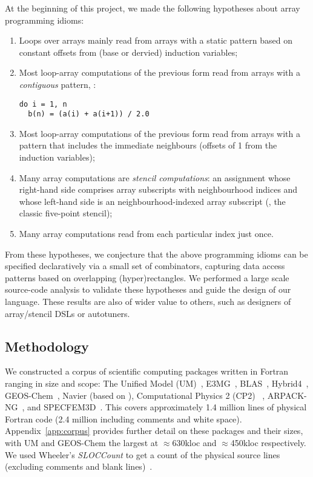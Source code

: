 
At the beginning of this project, we made the following hypotheses
about array programming idioms:
\begin{enumerate}
\item Loops over arrays mainly read from arrays with a static pattern
based on constant offsets from (base or dervied) induction variables;

\item Most loop-array computations of the previous form read
from arrays with a \emph{contiguous} pattern, \eg{}:
%
\begin{verbatim}
do i = 1, n
  b(n) = (a(i) + a(i+1)) / 2.0
\end{verbatim}
%
\item Most loop-array computations of the previous form read
from arrays with a pattern that includes the immediate
neighbours (offsets of 1 from the induction variables);

\item Many array computations are \emph{stencil computations}: an
  assignment whose right-hand side comprises array subscripts with
  neighbourhood indices and whose left-hand side is an
  neighbourhood-indexed array subscript (\eg{}, the classic five-point
  stencil);

\item Many array computations read from each particular index just once.
\end{enumerate}
%
From these hypotheses, we conjecture that the above programming idioms
can be specified declaratively via a small
set of combinators, capturing data access patterns based on
overlapping (hyper)rectangles. We performed a large scale source-code
analysis to validate these hypotheses and guide the design of our
language. These results are also of wider value to others, such as
designers of array/stencil DSLs or autotuners.

\subsection{Methodology}
%
\noindent
We constructed a corpus of \numPackages{} scientific computing
packages written in Fortran ranging in size and scope: The Unified
Model (UM)~\cite{um}, E3MG~\cite{RePEc:aen:journl:2006se-a12},
BLAS~\cite{blas}, Hybrid4~\cite{GBC:GBC635},
GEOS-Chem~\cite{geos-chem}, Navier (based on
\cite{griebel1997numerical}), Computational Physics 2 (CP2)
~\cite{nicholas2006computational}, ARPACK-NG~\cite{arpackng}, and
SPECFEM3D~\cite{specfem3d}.  This covers
approximately 1.4 million lines of physical Fortran code (2.4 million
including comments and white space).  Appendix~\ref{app:corpus}
provides further detail on these packages and their sizes, with UM and
GEOS-Chem the largest at $\approx$630kloc and $\approx$450kloc respectively. We used
Wheeler's \emph{SLOCCount} to get a count of the physical source lines
(excluding comments and blank lines)~\cite{wheeler2001sloccount}.

